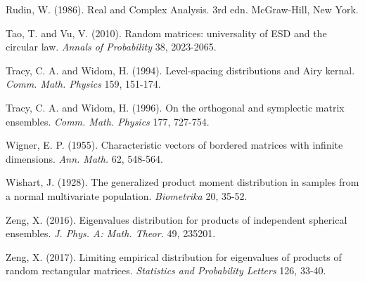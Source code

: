 \documentclass[11pt]{article}
\numberwithin{equation}{section}
\begin{document}
\begin{thebibliography}{AA}
Rudin, W. (1986). Real and Complex Analysis. 3rd edn. McGraw-Hill,
New York.

 Tao, T. and Vu, V. (2010). Random matrices: universality of ESD and the circular law.
{\it Annals of Probability} 38, 2023-2065.


Tracy, C. A. and Widom, H. (1994). Level-spacing distributions and
Airy kernal. {\it Comm. Math. Physics} 159, 151-174.

Tracy, C. A. and Widom, H. (1996). On the orthogonal and symplectic
matrix ensembles. {\it Comm. Math. Physics} 177, 727-754.



Wigner, E. P. (1955). Characteristic vectors of bordered matrices
with infinite dimensions. {\it Ann. Math.} 62, 548-564.

Wishart, J. (1928). The generalized product moment distribution in
samples from a normal multivariate population. {\it Biometrika} 20,
35-52.

Zeng, X. (2016). Eigenvalues distribution for products of
independent spherical ensembles. {\it J. Phys. A: Math. Theor.} 49,
235201.


Zeng, X. (2017). Limiting empirical distribution for eigenvalues of
products of random rectangular matrices. {\it Statistics and
Probability Letters} 126, 33-40.

\end{thebibliography}
\end{document}
